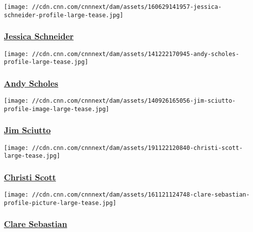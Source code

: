 \href{/profiles/jessica-schneider-profile}{}

\texttt{[image: //cdn.cnn.com/cnnnext/dam/assets/160629141957-jessica-schneider-profile-large-tease.jpg]}

\hypertarget{jessica-schneider}{%
\subsubsection{\texorpdfstring{\href{/profiles/jessica-schneider-profile}{Jessica
Schneider}}{Jessica Schneider}}\label{jessica-schneider}}

\href{/profiles/andy-scholes}{}

\texttt{[image: //cdn.cnn.com/cnnnext/dam/assets/141222170945-andy-scholes-profile-large-tease.jpg]}

\hypertarget{andy-scholes}{%
\subsubsection{\texorpdfstring{\href{/profiles/andy-scholes}{Andy
Scholes}}{Andy Scholes}}\label{andy-scholes}}

\href{/profiles/jim-sciutto}{}

\texttt{[image: //cdn.cnn.com/cnnnext/dam/assets/140926165056-jim-sciutto-profile-image-large-tease.jpg]}

\hypertarget{jim-sciutto}{%
\subsubsection{\texorpdfstring{\href{/profiles/jim-sciutto}{Jim
Sciutto}}{Jim Sciutto}}\label{jim-sciutto}}

\href{/profiles/christi-scott}{}

\texttt{[image: //cdn.cnn.com/cnnnext/dam/assets/191122120840-christi-scott-large-tease.jpg]}

\hypertarget{christi-scott}{%
\subsubsection{\texorpdfstring{\href{/profiles/christi-scott}{Christi
Scott}}{Christi Scott}}\label{christi-scott}}

\href{/profiles/clare-sebastian-profile}{}

\texttt{[image: //cdn.cnn.com/cnnnext/dam/assets/161121124748-clare-sebastian-profile-picture-large-tease.jpg]}

\hypertarget{clare-sebastian}{%
\subsubsection{\texorpdfstring{\href{/profiles/clare-sebastian-profile}{Clare
Sebastian}}{Clare Sebastian}}\label{clare-sebastian}}

